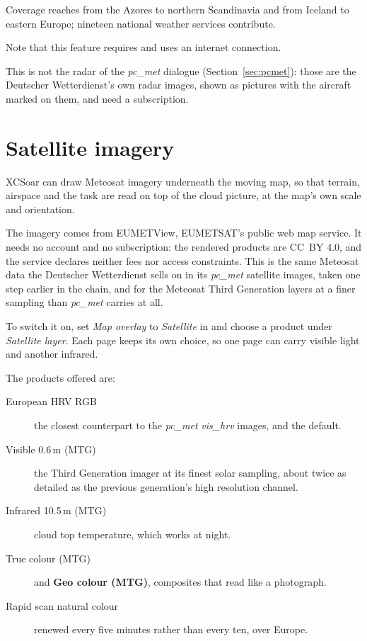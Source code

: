 Coverage reaches from the Azores to northern Scandinavia and from
Iceland to eastern Europe; nineteen national weather services
contribute.

Note that this feature requires and uses an internet connection.

This is not the radar of the \emph{pc\_met} dialogue
(Section~\ref{sec:pcmet}): those are the Deutscher Wetterdienst's own
radar images, shown as pictures with the aircraft marked on them, and
need a subscription.

\section{Satellite imagery}\label{sec:satellite}

XCSoar can draw Meteosat imagery underneath the moving map, so that
terrain, airspace and the task are read on top of the cloud picture,
at the map's own scale and orientation.

The imagery comes from EUMETView, EUMETSAT's public web map service.
It needs no account and no subscription: the rendered products are
CC~BY 4.0, and the service declares neither fees nor access
constraints.  This is the same Meteosat data the Deutscher
Wetterdienst sells on in its \emph{pc\_met} satellite images, taken
one step earlier in the chain, and for the Meteosat Third Generation
layers at a finer sampling than \emph{pc\_met} carries at all.

To switch it on, set \emph{Map overlay} to \emph{Satellite} in
 and choose a product under \emph{Satellite
layer}.  Each page keeps its own choice, so one page can carry visible
light and another infrared.

The products offered are:

\begin{description}
\item[European HRV RGB] the closest counterpart to the \emph{pc\_met}
  \emph{vis\_hrv} images, and the default.
\item[Visible 0.6\,\textmu m (MTG)] the Third Generation imager at its
  finest solar sampling, about twice as detailed as the previous
  generation's high resolution channel.
\item[Infrared 10.5\,\textmu m (MTG)] cloud top temperature, which
  works at night.
\item[True colour (MTG)] and \textbf{Geo colour (MTG)}, composites
  that read like a photograph.
\item[Rapid scan natural colour] renewed every five minutes rather
  than every ten, over Europe.
\end{description}


